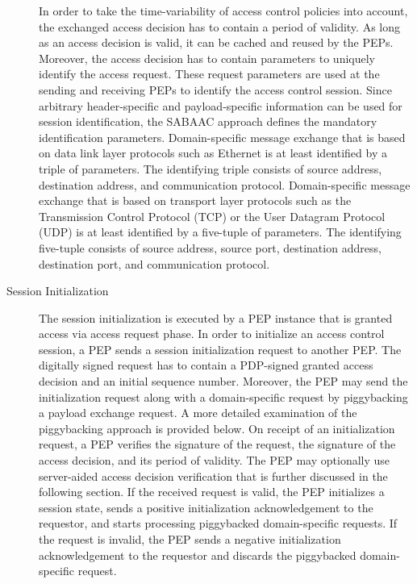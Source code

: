 \begin{description}
    In order to take the time-variability of access control policies into account, the exchanged access decision has to contain a period of validity.
    As long as an access decision is valid, it can be cached and reused by the PEPs.
    Moreover, the access decision has to contain parameters to uniquely identify the access request.
    These request parameters are used at the sending and receiving PEPs to identify the access control session.
    Since arbitrary header-specific and payload-specific information can be used for session identification, the SABAAC approach defines the mandatory identification parameters.
    Domain-specific message exchange that is based on data link layer protocols such as Ethernet is at least identified by a triple of parameters.
    The identifying triple consists of source address, destination address, and communication protocol.
    Domain-specific message exchange that is based on transport layer protocols such as the Transmission Control Protocol (TCP) or the User Datagram Protocol (UDP) is at least identified by a five-tuple of parameters.
    The identifying five-tuple consists of source address, source port, destination address, destination port, and communication protocol.
    \item[Session Initialization] The session initialization is executed by a PEP instance that is granted access via access request phase.
    In order to initialize an access control session, a PEP sends a session initialization request to another PEP.
    The digitally signed request has to contain a PDP-signed granted access decision and an initial sequence number.
    Moreover, the PEP may send the initialization request along with a domain-specific request by piggybacking a payload exchange request.
    A more detailed examination of the piggybacking approach is provided below.
    On receipt of an initialization request, a PEP verifies the signature of the request, the signature of the access decision, and its period of validity.
    The PEP may optionally use server-aided access decision verification that is further discussed in the following section.
    If the received request is valid, the PEP initializes a session state, sends a positive initialization acknowledgement to the requestor, and starts processing piggybacked domain-specific requests.
    If the request is invalid, the PEP sends a negative initialization acknowledgement to the requestor and discards the piggybacked domain-specific request.


\end{description}
